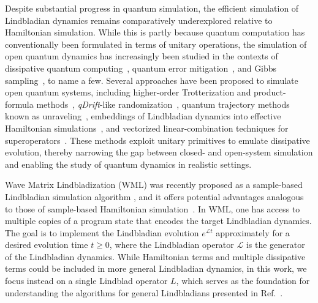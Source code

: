 \documentclass[superscriptaddress,amsmath,amssymb,aps,pra,letterpaper,tightenlines,notitlepages,12pt]{revtex4-2}
\begin{document}
Despite substantial progress in quantum simulation, the efficient simulation of Lindbladian dynamics remains comparatively underexplored relative to Hamiltonian simulation. While this is partly because quantum computation has conventionally been formulated in terms of unitary operations, the simulation of open quantum dynamics has increasingly been studied in the contexts of dissipative quantum computing~\cite{poyatos1996QuantumReservoirEngineering, cubitt2015StabilityLocalQuantuma, zhan2026RapidQuantumGround}, quantum error mitigation~\cite{vandenberg2023ProbabilisticErrorCancellation}, and Gibbs sampling~\cite{jin2024QuantumSimulationPartial, lin2025DissipativePreparationManybody}, to name a few. Several approaches have been proposed to simulate open quantum systems, including higher-order Trotterization and product-formula methods~\cite{li2023SimulatingMarkovianOpen, burdine2024EfficientSimulationOpen,childs2023EfficientSimulationSparse}, \emph{qDrift}-like randomization~\cite{kato2024ExponentiallyAccurateOpen, Peng2025,Chen2025randomizedmethod}, quantum trajectory methods known as unraveling~\cite{dalibard1992WavefunctionApproachDissipative, dum1992MonteCarloSimulation, carmichael1993OpenSystemsApproach, cao2025DynamicallyOptimalUnraveling}, embeddings of Lindbladian dynamics into effective Hamiltonian simulations~\cite{cleve2019EfficientQuantumAlgorithms, li2023SimulatingMarkovianOpen, ding2024SimulatingOpenQuantum, low2025OptimalQuantumSimulation}, and vectorized linear-combination techniques for superoperators~\cite{kamakari2022DigitalQuantumSimulation, schlimgen2022QuantumSimulationLindblad}. These methods exploit unitary primitives to emulate dissipative evolution, thereby narrowing the gap between closed- and open-system simulation and enabling the study of quantum dynamics in realistic settings.

Wave Matrix Lindbladization (WML) was recently proposed as a sample-based Lindbladian simulation algorithm \cite{patel2023WaveMatrixLindbladization, patel2023WaveMatrixLindbladizationa}, and it offers potential advantages analogous to those of sample-based Hamiltonian simulation~\cite{lloyd2014QuantumPrincipalComponent,kimmel2017HamiltonianSimulationOptimal, wei2024SimulatingNoncompletelyPositive, go2025SamplebasedHamiltonianLindbladian}. In WML, one has access to multiple copies of a program state that encodes the target Lindbladian dynamics. The goal is to implement the Lindbladian evolution $e^{ \mathcal{L} t}$ approximately for a desired evolution time $t \geq 0$, where the Lindbladian operator $\mathcal{L}$ is the generator of the Lindbladian dynamics. While Hamiltonian terms and multiple dissipative terms could be included in more general Lindbladian dynamics, in this work, we focus instead on a single Lindblad operator $L$, which serves as the foundation for understanding the algorithms for general Lindbladians presented in Ref.~\cite{patel2023WaveMatrixLindbladizationa}.
\end{document}
